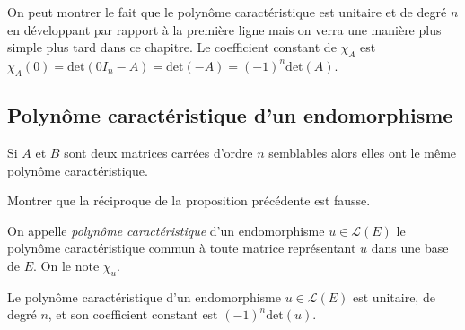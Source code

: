 \documentclass[french,11pt,twoside]{VcCours}
\begin{document}
\begin{Demonstration}{} On peut montrer le fait que le polynôme caractéristique est unitaire et de degré $n$ en développant par rapport à la première ligne mais on verra une manière plus simple plus tard dans ce chapitre. Le coefficient constant de $\chi_A$ est $\chi_A(0) = \textrm{det}(0 I_n-A) = \textrm{det}(-A) = (-1)^n \textrm{det}(A)$.
\end{Demonstration} 

\subsection{Polynôme caractéristique d'un endomorphisme}


\begin{Proposition}{} Si $A$ et $B$ sont deux matrices carrées d'ordre $n$ semblables alors elles ont le même polynôme caractéristique.
\end{Proposition}

\begin{Demonstration}{} 

\end{Demonstration}
\newpage

\begin{ApplicationDirecte}{} Montrer que la réciproque de la proposition précédente est fausse. 
\end{ApplicationDirecte}

\begin{Definition}{} On appelle \emph{polynôme caractéristique} d'un endomorphisme $u \in \mathcal{L}(E)$ le polynôme caractéristique commun à toute matrice représentant $u$ dans une base de $E$. On le note $\chi_u$.
\end{Definition}

\begin{Proposition}{} Le polynôme caractéristique d'un endomorphisme $u \in \mathcal{L}(E)$ est unitaire, de degré $n$, et son coefficient constant est $(-1)^n \textrm{det}(u)$.
\end{Proposition}
\end{document}
